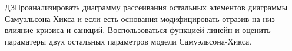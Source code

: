 \documentclass[12pt,a4paper]{article}
\begin{document}
$\displaystyle \boxed{\text{ДЗ}}$Проанализировать диаграмму рассеивания остальных элементов диаграммы Самуэльсона-Хикса и если есть основания модифицировать отразив на низ влияние кризиса и санкций. Воспользоваться функцией линейн и оценить параматеры двух остальных параметров модели Самуэльсона-Хикса.
\end{document}
